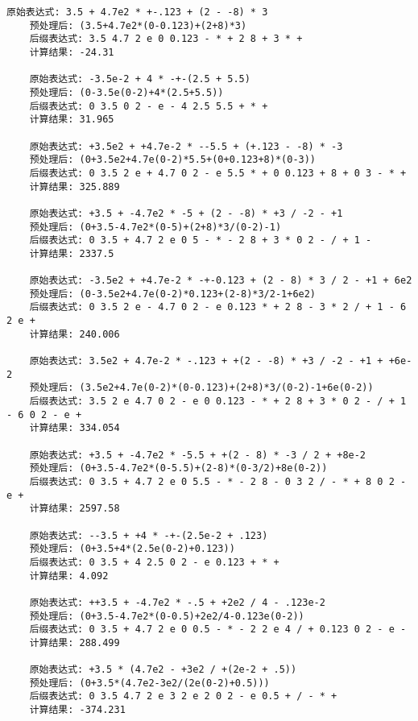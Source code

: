\documentclass[UTF8]{ctexart}
\begin{document}
\begin{lstlisting}[breaklines=true]
    原始表达式: 3.5 + 4.7e2 * +-.123 + (2 - -8) * 3
    预处理后: (3.5+4.7e2*(0-0.123)+(2+8)*3)
    后缀表达式: 3.5 4.7 2 e 0 0.123 - * + 2 8 + 3 * + 
    计算结果: -24.31
    
    原始表达式: -3.5e-2 + 4 * -+-(2.5 + 5.5)
    预处理后: (0-3.5e(0-2)+4*(2.5+5.5))
    后缀表达式: 0 3.5 0 2 - e - 4 2.5 5.5 + * + 
    计算结果: 31.965
    
    原始表达式: +3.5e2 + +4.7e-2 * --5.5 + (+.123 - -8) * -3
    预处理后: (0+3.5e2+4.7e(0-2)*5.5+(0+0.123+8)*(0-3))
    后缀表达式: 0 3.5 2 e + 4.7 0 2 - e 5.5 * + 0 0.123 + 8 + 0 3 - * + 
    计算结果: 325.889
    
    原始表达式: +3.5 + -4.7e2 * -5 + (2 - -8) * +3 / -2 - +1
    预处理后: (0+3.5-4.7e2*(0-5)+(2+8)*3/(0-2)-1)
    后缀表达式: 0 3.5 + 4.7 2 e 0 5 - * - 2 8 + 3 * 0 2 - / + 1 - 
    计算结果: 2337.5
    
    原始表达式: -3.5e2 + +4.7e-2 * -+-0.123 + (2 - 8) * 3 / 2 - +1 + 6e2
    预处理后: (0-3.5e2+4.7e(0-2)*0.123+(2-8)*3/2-1+6e2)
    后缀表达式: 0 3.5 2 e - 4.7 0 2 - e 0.123 * + 2 8 - 3 * 2 / + 1 - 6 2 e + 
    计算结果: 240.006
    
    原始表达式: 3.5e2 + 4.7e-2 * -.123 + +(2 - -8) * +3 / -2 - +1 + +6e-2
    预处理后: (3.5e2+4.7e(0-2)*(0-0.123)+(2+8)*3/(0-2)-1+6e(0-2))
    后缀表达式: 3.5 2 e 4.7 0 2 - e 0 0.123 - * + 2 8 + 3 * 0 2 - / + 1 - 6 0 2 - e + 
    计算结果: 334.054
    
    原始表达式: +3.5 + -4.7e2 * -5.5 + +(2 - 8) * -3 / 2 + +8e-2
    预处理后: (0+3.5-4.7e2*(0-5.5)+(2-8)*(0-3/2)+8e(0-2))
    后缀表达式: 0 3.5 + 4.7 2 e 0 5.5 - * - 2 8 - 0 3 2 / - * + 8 0 2 - e + 
    计算结果: 2597.58
    
    原始表达式: --3.5 + +4 * -+-(2.5e-2 + .123)
    预处理后: (0+3.5+4*(2.5e(0-2)+0.123))
    后缀表达式: 0 3.5 + 4 2.5 0 2 - e 0.123 + * + 
    计算结果: 4.092
    
    原始表达式: ++3.5 + -4.7e2 * -.5 + +2e2 / 4 - .123e-2
    预处理后: (0+3.5-4.7e2*(0-0.5)+2e2/4-0.123e(0-2))
    后缀表达式: 0 3.5 + 4.7 2 e 0 0.5 - * - 2 2 e 4 / + 0.123 0 2 - e - 
    计算结果: 288.499
    
    原始表达式: +3.5 * (4.7e2 - +3e2 / +(2e-2 + .5))
    预处理后: (0+3.5*(4.7e2-3e2/(2e(0-2)+0.5)))
    后缀表达式: 0 3.5 4.7 2 e 3 2 e 2 0 2 - e 0.5 + / - * + 
    计算结果: -374.231
\end{lstlisting}    
\end{document}
